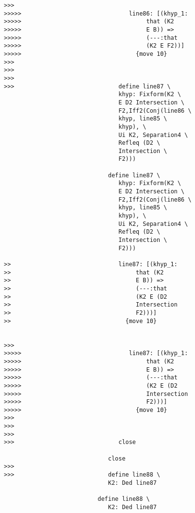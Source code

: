 \documentclass[12pt]{article}
\begin{document}
\begin{verbatim}
>>>
>>>>>                               line86: [(khyp_1:
>>>>>                                    that (K2
>>>>>                                    E B)) =>
>>>>>                                    (---:that
>>>>>                                    (K2 E F2))]
>>>>>                                 {move 10}
>>>
>>>
>>>
>>>                              define line87 \
                                 khyp: Fixform(K2 \
                                 E D2 Intersection \
                                 F2,Iff2(Conj(line86 \
                                 khyp, line85 \
                                 khyp), \
                                 Ui K2, Separation4 \
                                 Refleq (D2 \
                                 Intersection \
                                 F2)))

                              define line87 \
                                 khyp: Fixform(K2 \
                                 E D2 Intersection \
                                 F2,Iff2(Conj(line86 \
                                 khyp, line85 \
                                 khyp), \
                                 Ui K2, Separation4 \
                                 Refleq (D2 \
                                 Intersection \
                                 F2)))

>>                               line87: [(khyp_1:
>>                                    that (K2
>>                                    E B)) =>
>>                                    (---:that
>>                                    (K2 E (D2
>>                                    Intersection
>>                                    F2)))]
>>                                 {move 10}


>>>
>>>>>                               line87: [(khyp_1:
>>>>>                                    that (K2
>>>>>                                    E B)) =>
>>>>>                                    (---:that
>>>>>                                    (K2 E (D2
>>>>>                                    Intersection
>>>>>                                    F2)))]
>>>>>                                 {move 10}
>>>
>>>
>>>
>>>                              close

                              close
>>>
>>>                           define line88 \
                              K2: Ded line87

                           define line88 \
                              K2: Ded line87



\end{verbatim}
\end{document}
